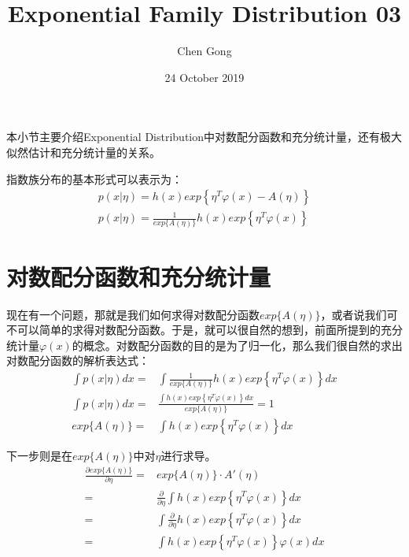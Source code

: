 \documentclass[a4paper]{article}
\title{Exponential Family Distribution 03}
\author{Chen Gong}
\date{24 October 2019}
\begin{document}
\maketitle

本小节主要介绍Exponential Distribution中对数配分函数和充分统计量，还有极大似然估计和充分统计量的关系。

指数族分布的基本形式可以表示为：
\begin{gather}
    p(x|\eta) = h(x)exp\left\{ \eta^T\varphi(x)-A(\eta) \right\} \\
    p(x|\eta) = \frac{1}{exp \{A(\eta)\}} h(x)exp\left\{ \eta^T\varphi(x)\right\}
\end{gather}
    

\section{对数配分函数和充分统计量}
现在有一个问题，那就是我们如何求得对数配分函数$exp\{ A(\eta) \}$，或者说我们可不可以简单的求得对数配分函数。于是，就可以很自然的想到，前面所提到的充分统计量$\varphi(x)$的概念。对数配分函数的目的是为了归一化，那么我们很自然的求出对数配分函数的解析表达式：
\begin{equation}
    \begin{split}
        \int p(x|\eta) dx = & 
        \int \frac{1}{exp \{A(\eta)\}} h(x)exp\left\{ \eta^T\varphi(x)\right\} dx\\
        \int p(x|\eta) dx = & \frac{\int h(x)exp\left\{ \eta^T\varphi(x)\right\} dx}{exp \{A(\eta)\}} = 1 \\
        exp \{A(\eta)\} = & \int h(x)exp\left\{ \eta^T\varphi(x)\right\} dx 
    \end{split}
\end{equation}

下一步则是在$exp \{A(\eta)\}$中对$\eta$进行求导。
\begin{equation}
    \begin{split}
        \frac{\partial exp \{A(\eta)\}}{\partial \eta} = & exp \{A(\eta)\} \cdot A'(\eta) \\
        = & \frac{\partial}{\partial \eta}\int h(x)exp\left\{ \eta^T\varphi(x)\right\} dx \\
        = & \int \frac{\partial}{\partial \eta} h(x)exp\left\{ \eta^T\varphi(x)\right\} dx \\
        = & \int h(x)exp\left\{ \eta^T\varphi(x)\right\}\varphi(x) dx \\
    \end{split}
\end{equation}
\end{document}
